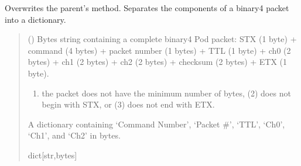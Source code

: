 \documentclass[letterpaper,10pt,english]{sphinxmanual}
\begin{document}
\begin{fulllineitems}
\begin{fulllineitems}
\label{\detokenize{PodDevice_8206HR:PodDevice_8206HR.POD_8206HR.UnpackPODpacket_Binary}}
\pysigstartsignatures
{}
\pysigstopsignatures
\sphinxAtStartPar
Overwrites the parent’s method. Separates the components of a binary4 packet into a dictionary.
\begin{quote}\begin{description}
\sphinxAtStartPar
{} () \textendash{} Bytes string containing a complete binary4 Pod packet:  STX (1 byte)                  + command (4 bytes) + packet number (1 bytes) + TTL (1 byte) + ch0 (2 bytes)                 + ch1 (2 bytes) + ch2 (2 bytes) + checksum (2 bytes) + ETX (1 byte).

\sphinxAtStartPar
{} \textendash{} \begin{enumerate}
%
\item {} 
\sphinxAtStartPar
the packet does not have the minimum number of bytes, (2) does not begin                 with STX, or (3) does not end with ETX.

\end{enumerate}


\sphinxAtStartPar
A dictionary containing ‘Command Number’, ‘Packet \#’, ‘TTL’, ‘Ch0’, ‘Ch1’,                 and ‘Ch2’ in bytes.

\sphinxAtStartPar
dict{[}str,bytes{]}

\end{description}\end{quote}

\end{fulllineitems}



\end{fulllineitems}
\end{document}
